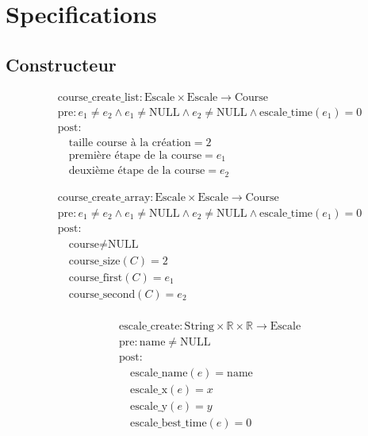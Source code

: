 \section{Specifications}\label{specifications}

\subsection{Constructeur}


\[
\begin{aligned}
&\text{course\_create_list}: \text{Escale} \times \text{Escale} \to \text{Course} \\
&\text{pre}: e_1 \neq e_2 \land e_1 \neq \text{NULL} \land e_2 \neq \text{NULL} \land \text{escale\_time}(e_1) = 0 \\
&\text{post}: \\
&\quad \text{taille course à la création} = 2 \\
&\quad \text{première étape de la course} = e_1 \\
&\quad \text{deuxième  étape de la course} = e_2
\end{aligned}
\]



\[
\begin{aligned}
&\text{course\_create_array}: \text{Escale} \times \text{Escale} \to \text{Course} \\
&\text{pre}: e_1 \neq e_2 \land e_1 \neq \text{NULL} \land e_2 \neq \text{NULL} \land \text{escale\_time}(e_1) = 0 \\
&\text{post}: \\
&\quad \text{course} \neq \text{NULL} \\
&\quad \text{course\_size}(C) = 2 \\
&\quad \text{course\_first}(C) = e_1 \\
&\quad \text{course\_second}(C) = e_2 \\
\end{aligned}
\]


\[
\begin{aligned}
&\text{escale\_create}: \text{String} \times \mathbb{R} \times \mathbb{R} \to \text{Escale} \\
&\text{pre}: \text{name} \neq \text{NULL} \\
&\text{post}: \\
&\quad \text{escale\_name}(e) = \text{name} \\
&\quad \text{escale\_x}(e) = x \\
&\quad \text{escale\_y}(e) = y \\
&\quad \text{escale\_best\_time}(e) = 0
\end{aligned}
\]



